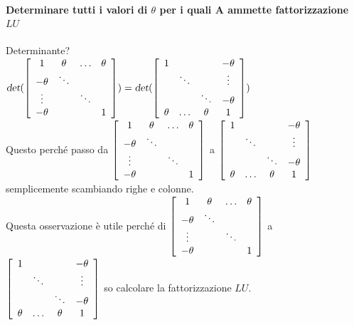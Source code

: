 \documentclass[10pt]{book}
\begin{document}
\paragraph{Determinare tutti i valori di $\theta$ per i quali A ammette fattorizzazione $LU$} Determinante?\\$\textsl{det}(\left[ 
\begin{array}{c c c c}
1 & \theta & \ldots & \theta \\
-\theta & \ddots & &\\
\vdots & & \ddots &\\
-\theta & & & 1
\end{array}
\right]) = \textsl{det}(\left[ 
\begin{array}{c c c c}
1 & & & -\theta\\
& \ddots & & \vdots\\
& & \ddots & -\theta\\
\theta & \ldots & \theta & 1
\end{array}
\right])$\\
Questo perché passo da $\left[ 
\begin{array}{c c c c}
1 & \theta & \ldots & \theta \\
-\theta & \ddots & &\\
\vdots & & \ddots &\\
-\theta & & & 1
\end{array}
\right]$ a $\left[ 
\begin{array}{c c c c}
1 & & & -\theta\\
& \ddots & & \vdots\\
& & \ddots & -\theta\\
\theta & \ldots & \theta & 1
\end{array}
\right]$ semplicemente scambiando righe e colonne.\\
Questa osservazione è utile perché di $\left[ 
\begin{array}{c c c c}
1 & \theta & \ldots & \theta \\
-\theta & \ddots & &\\
\vdots & & \ddots &\\
-\theta & & & 1
\end{array}
\right]$ a $\left[ 
\begin{array}{c c c c}
1 & & & -\theta\\
& \ddots & & \vdots\\
& & \ddots & -\theta\\
\theta & \ldots & \theta & 1
\end{array}
\right]$ so calcolare la fattorizzazione $LU$.
\end{document}
